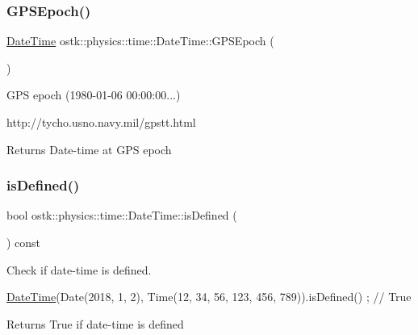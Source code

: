 \subsubsection{\texorpdfstring{G\+P\+S\+Epoch()}{GPSEpoch()}}
{\footnotesize\ttfamily \hyperlink{classostk_1_1physics_1_1time_1_1_date_time}{Date\+Time} ostk\+::physics\+::time\+::\+Date\+Time\+::\+G\+P\+S\+Epoch (\begin{DoxyParamCaption}{ }\end{DoxyParamCaption})\hspace{0.3cm}{\ttfamily [static]}}



G\+PS epoch (1980-\/01-\/06 00\+:00\+:00...) 

http\+://tycho.usno.\+navy.\+mil/gpstt.html

\begin{DoxyReturn}{Returns}
Date-\/time at G\+PS epoch 
\end{DoxyReturn}
\mbox{\label{classostk_1_1physics_1_1time_1_1_date_time_a2fd2deab390516483e1757c45ae81282}} 
\subsubsection{\texorpdfstring{is\+Defined()}{isDefined()}}
{\footnotesize\ttfamily bool ostk\+::physics\+::time\+::\+Date\+Time\+::is\+Defined (\begin{DoxyParamCaption}{ }\end{DoxyParamCaption}) const}



Check if date-\/time is defined. 


\begin{DoxyCode}
\hyperlink{classostk_1_1physics_1_1time_1_1_date_time_a974b5a7581ae7461ccf0e6ab85e42633}{DateTime}(Date(2018, 1, 2), Time(12, 34, 56, 123, 456, 789)).isDefined() ; \textcolor{comment}{// True}
\end{DoxyCode}


\begin{DoxyReturn}{Returns}
True if date-\/time is defined 
\end{DoxyReturn}
\mbox{\label{classostk_1_1physics_1_1time_1_1_date_time_a819a122626c39c4cc99429f5ae9fa749}} 
